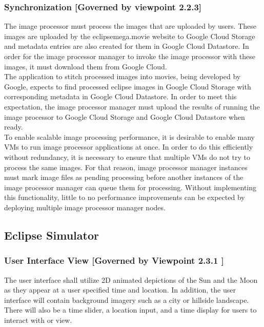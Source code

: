\documentclass[10pt, onecolumn, draftclsnofoot, letterpaper, compsoc]{IEEEtran}
\begin{document}
    \subsubsection{Synchronization [Governed by viewpoint 2.2.3]}
    The image processor must process the images that are uploaded by users. These images are uploaded by the 
    eclipsemega.movie website to Google Cloud Storage and metadata entries are also created for them in Google 
    Cloud Datastore. In order for the image processor manager to invoke the image processor with these images, 
    it must download them from Google Cloud. \\

    The application to stitch processed images into movies, being developed by Google, expects to find 
    processed eclipse images in Google Cloud Storage with corresponding metadata in Google Cloud Datastore. In 
    order to meet this expectation, the image processor manager must upload the results of running the image 
    processor to Google Cloud Storage and Google Cloud Datastore when ready. \\

    To enable scalable image processing performance, it is desirable to enable many VMs to run image processor 
    applications at once. In order to do this efficiently without redundancy, it is necessary to ensure that 
    multiple VMs do not try to process the same images. For that reason, image processor manager instances must 
    mark image files as pending processing before another instances of the image processor manager can queue 
    them for processing. Without implementing this functionality, little to no performance improvements can be 
    expected by deploying multiple image processor manager nodes. \\

\subsection{Eclipse Simulator}

  \subsubsection{User Interface View [Governed by Viewpoint 2.3.1 ]}
  The user interface shall utilize 2D animated depictions of
  the Sun and the Moon as they appear at a user specified
  time and location. In addition, the user interface will
  contain background imagery such as a city or hillside
  landscape. There will also be a time slider, a location
  input, and a time display for users to interact with or
  view. \\
\end{document}
